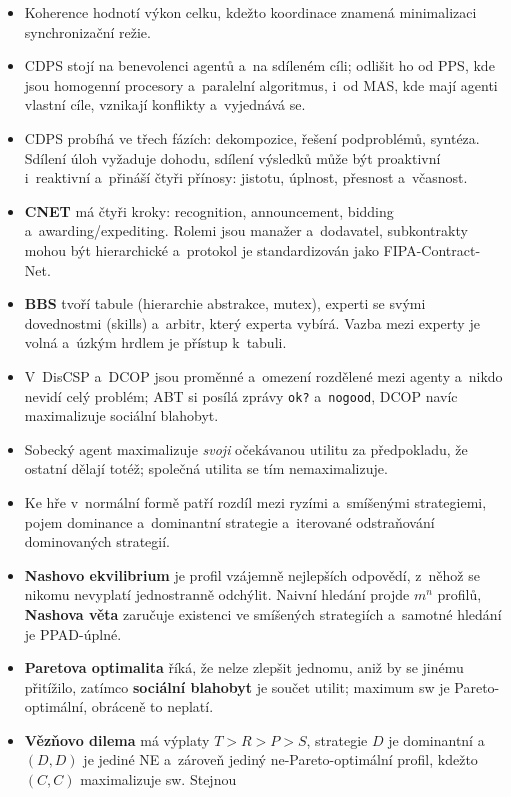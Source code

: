 \documentclass[11pt,a4paper]{article}
\theoremstyle{definition}
\begin{document}
\begin{itemize}
\item Koherence hodnotí výkon celku, kdežto koordinace znamená minimalizaci synchronizační režie.
\item CDPS stojí na benevolenci agentů a~na sdíleném cíli; odlišit ho od PPS, kde jsou homogenní
  procesory a~paralelní algoritmus, i~od MAS, kde mají agenti vlastní cíle, vznikají konflikty
  a~vyjednává se.
\item CDPS probíhá ve třech fázích: dekompozice, řešení podproblémů, syntéza. Sdílení úloh
  vyžaduje dohodu, sdílení výsledků může být proaktivní i~reaktivní a~přináší čtyři přínosy:
  jistotu, úplnost, přesnost a~včasnost.
\item \textbf{CNET} má čtyři kroky: recognition, announcement, bidding a~awarding/expediting.
  Rolemi jsou manažer a~dodavatel, subkontrakty mohou být hierarchické a~protokol je
  standardizován jako FIPA-Contract-Net.
\item \textbf{BBS} tvoří tabule (hierarchie abstrakce, mutex), experti se svými dovednostmi
  (skills) a~arbitr, který experta vybírá. Vazba mezi experty je volná a~úzkým hrdlem je přístup
  k~tabuli.
\item V~DisCSP a~DCOP jsou proměnné a~omezení rozdělené mezi agenty a~nikdo nevidí celý problém;
  ABT si posílá zprávy \texttt{ok?} a~\texttt{nogood}, DCOP navíc maximalizuje sociální blahobyt.
\item Sobecký agent maximalizuje \emph{svoji} očekávanou utilitu za předpokladu, že ostatní
  dělají totéž; společná utilita se tím nemaximalizuje.
\item Ke hře v~normální formě patří rozdíl mezi ryzími a~smíšenými strategiemi, pojem dominance
  a~dominantní strategie a~iterované odstraňování dominovaných strategií.
\item \textbf{Nashovo ekvilibrium} je profil vzájemně nejlepších odpovědí, z~něhož se nikomu
  nevyplatí jednostranně odchýlit. Naivní hledání projde $m^n$ profilů, \textbf{Nashova věta}
  zaručuje existenci ve smíšených strategiích a~samotné hledání je PPAD-úplné.
\item \textbf{Paretova optimalita} říká, že nelze zlepšit jednomu, aniž by se jinému přitížilo,
  zatímco \textbf{sociální blahobyt} je součet utilit; maximum sw je Pareto-optimální,
  obráceně to neplatí.
\item \textbf{Vězňovo dilema} má výplaty $T>R>P>S$, strategie $D$ je dominantní a~$(D,D)$ je
  jediné NE a~zároveň jediný ne-Pareto-optimální profil, kdežto $(C,C)$ maximalizuje sw. Stejnou

\end{itemize}
\end{document}
